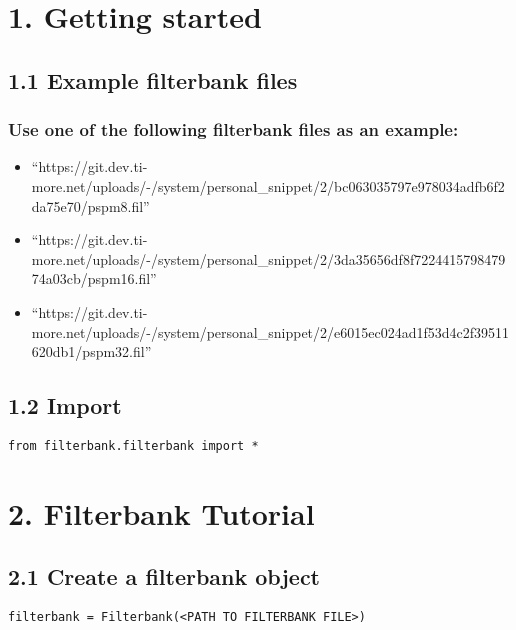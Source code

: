 \documentclass[]{article}
\date{}
\providecommand{\tightlist}{%
  \setlength{\itemsep}{0pt}\setlength{\parskip}{0pt}}
\begin{document}
\section{1. Getting started}\label{getting-started}

\subsection{1.1 Example filterbank
files}\label{example-filterbank-files}

\subsubsection{Use one of the following filterbank files as an
example:}\label{use-one-of-the-following-filterbank-files-as-an-example}

\begin{itemize}
\tightlist
\item
  ``https://git.dev.ti-more.net/uploads/-/system/personal\_snippet/2/bc063035797e978034adfb6f2da75e70/pspm8.fil''
\item
  ``https://git.dev.ti-more.net/uploads/-/system/personal\_snippet/2/3da35656df8f722441579847974a03cb/pspm16.fil''
\item
  ``https://git.dev.ti-more.net/uploads/-/system/personal\_snippet/2/e6015ec024ad1f53d4c2f39511620db1/pspm32.fil''
\end{itemize}

\subsection{1.2 Import}\label{import}

\begin{verbatim}
from filterbank.filterbank import *
\end{verbatim}

\section{2. Filterbank Tutorial}\label{filterbank-tutorial}

\subsection{2.1 Create a filterbank
object}\label{create-a-filterbank-object}

\begin{verbatim}
filterbank = Filterbank(<PATH TO FILTERBANK FILE>)
\end{verbatim}
\end{document}
